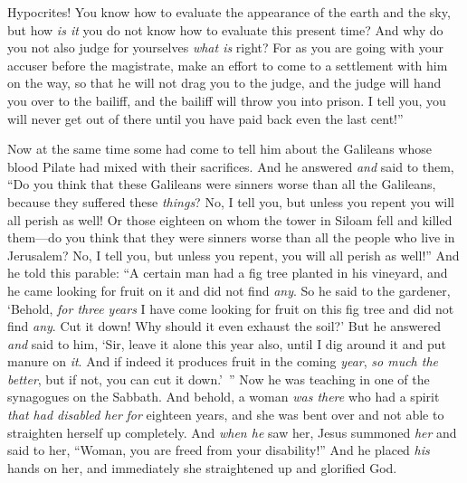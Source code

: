 \begin{biblechapter}
\verse Hypocrites! You know how to evaluate the appearance of the earth and the sky, but how \textit{is it} you do not know how to evaluate this present time?
 And why do you not also judge for yourselves \textit{what is} right?
\verse For as you are going with your accuser before the magistrate, make an effort to come to a settlement with him on the way, so that he will not drag you to the judge, and the judge will hand you over to the bailiff, and the bailiff will throw you into prison.
\verse I tell you, you will never get out of there until you have paid back even the last cent!”
\end{biblechapter}

\begin{biblechapter} %
 Now at the same time some had come to tell him about the Galileans whose blood Pilate had mixed with their sacrifices.
\verse And he answered \textit{and} said to them, “Do you think that these Galileans were sinners worse than all the Galileans, because they suffered these \textit{things}?
\verse No, I tell you, but unless you repent you will all perish as well!
\verse Or those eighteen on whom the tower in Siloam fell and killed them—do you think that they were sinners worse than all the people who live in Jerusalem?
\verse No, I tell you, but unless you repent, you will all perish as well!”
 And he told this parable: “A certain man had a fig tree planted in his vineyard, and he came looking for fruit on it and did not find \textit{any}.
\verse So he said to the gardener, ‘Behold, \textit{for three years} I have come looking for fruit on this fig tree and did not find \textit{any}. Cut it down! Why should it even exhaust the soil?’
\verse But he answered \textit{and} said to him, ‘Sir, leave it alone this year also, until I dig around it and put manure on \textit{it}.
\verse And if indeed it produces fruit in the coming \textit{year}, \textit{so much the better}, but if not, you can cut it down.’ ”
 Now he was teaching in one of the synagogues on the Sabbath.
\verse And behold, a woman \textit{was there} who had a spirit \textit{that had disabled her} \textit{for} eighteen years, and she was bent over and not able to straighten herself up completely.
\verse And \textit{when he} saw her, Jesus summoned \textit{her} and said to her, “Woman, you are freed from your disability!”
\verse And he placed \textit{his} hands on her, and immediately she straightened up and glorified God.

\end{biblechapter}
